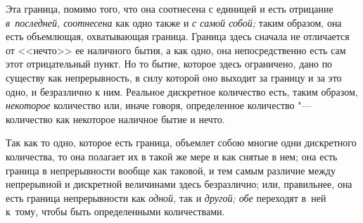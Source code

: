 Эта граница, помимо того, что она соотнесена с единицей и есть отрицание
{\em в~последней, соотнесена} как одно также и {\em с самой собой;} таким
образом, она есть объемлющая, охватывающая граница. Граница здесь сначала не
отличается от <<нечто>> ее наличного бытия, а как одно, она непосредственно
есть сам этот отрицательный пункт. Но то бытие, которое здесь ограничено, дано
по существу как непрерывность, в силу которой оно выходит за границу и за это
одно, и безразлично к ним. Реальное дискретное количество есть, таким образом,
{\em некоторое} количество или, иначе говоря, определенное количество "---
количество как некоторое наличное бытие и нечто.

Так как то одно, которое есть граница, объемлет собою многие одни дискретного
количества, то она полагает их в такой же мере и как снятые в нем; она есть
граница в непрерывности вообще как таковой, и тем самым различие между
непрерывной и дискретной величинами здесь безразлично; или, правильнее, она
есть граница непрерывности как {\em одной}, так и {\em другой; обе} переходят
в~ней к~тому, чтобы быть определенными количествами.

\bigskip
